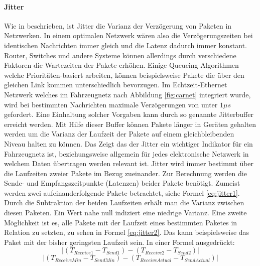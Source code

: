 \documentclass[draft=false
              ,paper=a4
              ,twoside=false
              ,fontsize=11pt
              ,headsepline
              ,BCOR10mm
              ,DIV11
              ]{scrbook}
\begin{document}
\paragraph{Jitter} %
\label{par:jitter}
Wie in \cite{mansour_jitter_2001} beschrieben, ist Jitter die Varianz der Verzögerung von Paketen in Netzwerken. In einem optimalen Netzwerk wären also die Verzögerungszeiten bei identischen Nachrichten immer gleich und die Latenz dadurch immer konstant. Router, Switches und andere Systeme können allerdings durch verschiedene Faktoren die Wartezeiten der Pakete erhöhen. Einige Queueing-Algorithmen welche Prioritäten-basiert arbeiten, können beispielsweise Pakete die über den gleichen Link kommen unterschiedlich bevorzugen. Im Echtzeit-Ethernet Netzwerk welches im Fahrzeugnetz nach Abbildung \ref{fig:carnet} integriert wurde, wird bei bestimmten Nachrichten maximale Verzögerungen von unter $1 \mu s$ gefordert. Eine Einhaltung solcher Vorgaben kann durch so genannte Jitterbuffer erreicht werden. Mit Hilfe dieser Buffer können Pakete länger in Geräten gehalten werden um die Varianz der Laufzeit der Pakete auf einem gleichbleibenden Niveau halten zu können. Das Zeigt das der Jitter ein wichtiger Indikator für ein Fahrzeugnetz ist, beziehungsweise allgemein für jedes elektronische Netzwerk in welchem Daten übertragen werden relevant ist. Jitter wird immer bestimmt über die Laufzeiten zweier Pakete im Bezug zueinander. Zur Berechnung werden die Sende- und Empfangszeitpunkte (Latenzen) beider Pakete benötigt. Zumeist werden zwei aufeinanderfolgende Pakete betrachtet, siehe Formel \ref{eq:jitter1}. Durch die Subtraktion der beiden Laufzeiten erhält man die Varianz zwischen diesen Paketen. Ein Wert nahe null indiziert eine niedrige Varianz. Eine zweite Möglichkeit ist es, alle Pakete mit der Laufzeit eines bestimmten Paketes in Relation zu setzten, zu sehen in Formel \ref{eq:jitter2}. Das kann beispielsweise das Paket mit der bisher geringsten Laufzeit sein.
In einer Formel ausgedrückt: 
\begin{equation}
  |(T_{Receive1} - T_{Send1}) - (T_{Receive2} - T_{Send2})|
  \label{eq:jitter1}
\end{equation}
\begin{equation}
    |(T_{ReceiveMin} - T_{SendMin})  - (T_{ReceiveActual} - T_{SendActual})|
    \label{eq:jitter2}
\end{equation}
\end{document}
